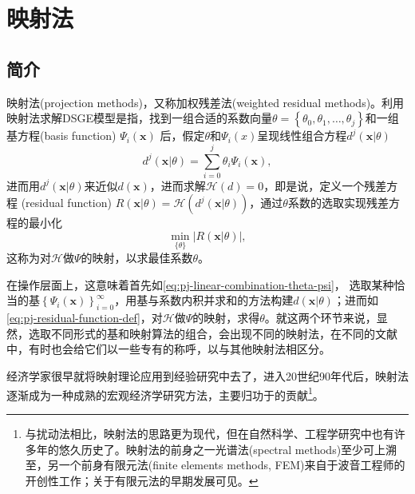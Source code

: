 \chapter{映射法}

\section{简介}
映射法(projection methods)，又称加权残差法(weighted residual methods)。利用映射法求解DSGE模型是指，找到一组合适的系数向量$\theta = \left\{
\theta_0, \theta_1, \ldots, \theta_j \right\}$和一组基方程(basis function)  $\Psi_i(\bm{x})$ 后，假定$\theta$和$\Psi_i(x)$呈现线性组合方程$d^{j}(\bm{x}|\theta)$
\begin{equation}
  \label{eq:pj-linear-combination-theta-psi}
  d^{j}(\bm{x}|\theta) = \sum_{i=0}^{j}\theta_{i} \Psi_i(\bm{x}),
\end{equation}
进而用$d^j(\bm{x}|\theta)$来近似$d(\bm{x})$，进而求解$\mathcal{H}(d) = 0$，即是说，定义一个残差方程 (residual function)   $R(\bm{x}|\theta) = \mathcal{H}\left( d^j(\bm{x}|\theta) \right)$，通过$\theta$系数的选取实现残差方程的最小化
\begin{equation}
  \label{eq:pj-residual-function-def}
  \min_{\{\theta\}} \left| R(\bm{x}|\theta) \right|,
\end{equation}
这称为对$\mathcal{H}$做$\Psi$的映射，以求最佳系数$\theta$。

在操作层面上，这意味着首先如\eqref{eq:pj-linear-combination-theta-psi}， 选取某种恰当的基$\left\{ \Psi_i (\bm{x})\right\}_{i=0}^{\infty}$，用基与系数内积并求和的方法构建$d(\bm{x} | \theta)$；进而如\eqref{eq:pj-residual-function-def}，对$\mathcal{H}$做$\Psi$的映射，求得$\theta$。就这两个环节来说，显然，选取不同形式的基和映射算法的组合，会出现不同的映射法，在不同的文献中，有时也会给它们以一些专有的称呼，以与其他映射法相区分。

经济学家很早就将映射理论应用到经验研究中去了，进入20世纪90年代后，映射法逐渐成为一种成熟的宏观经济学研究方法，主要归功于\cite{Judd:1992gs,Gaspar:1997we,Judd:1998uy}的贡献\footnote{与扰动法相比，映射法的思路更为现代，但在自然科学、工程学研究中也有许多年的悠久历史了。映射法的前身之一光谱法(spectral methods)至少可上溯至\cite{Lanczos:1938hy}，另一个前身有限元法(finite elements methods, FEM)来自于波音工程师\cite{Clough:1960wq}的开创性工作；关于有限元法的早期发展可见\cite{Clough:1999uo}。}。

